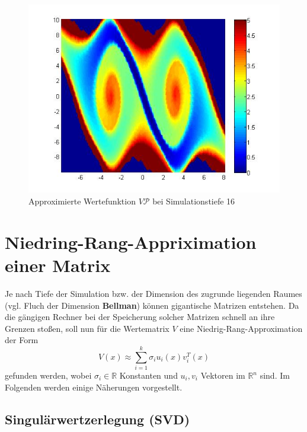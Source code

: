 \documentclass[12pt,a4paper,twoside]{article}
\begin{document}
	\begin{figure}[h]
		\center
		\includegraphics[scale=0.55]{valuefunction_plot_256.jpg}
		\caption{Approximierte Wertefunktion $V\mathcal{P}$ bei Simulationstiefe 16}
	\end{figure}
	\newpage
\section{Niedring-Rang-Appriximation einer Matrix}
	Je nach Tiefe der Simulation bzw. der Dimension des zugrunde liegenden Raumes (vgl. Fluch der Dimension \textbf{Bellman}) können gigantische Matrizen entstehen. Da die gängigen Rechner bei der Speicherung solcher Matrizen schnell an ihre Grenzen stoßen, soll nun für die Wertematrix $V$ eine Niedrig-Rang-Approximation der Form
	\begin{equation}
		\label{eq:approx}
		V(x)\approx \sum_{i=1}^k\sigma_i u_i(x) v_i^T(x)
	\end{equation}
	gefunden werden, wobei $\sigma_i\in \mathds{R}$ Konstanten und $u_i, v_i$ Vektoren im $\mathds{R}^n$ sind. Im Folgenden werden einige Näherungen vorgestellt.
	\subsection{Singulärwertzerlegung (SVD)}
\end{document}
